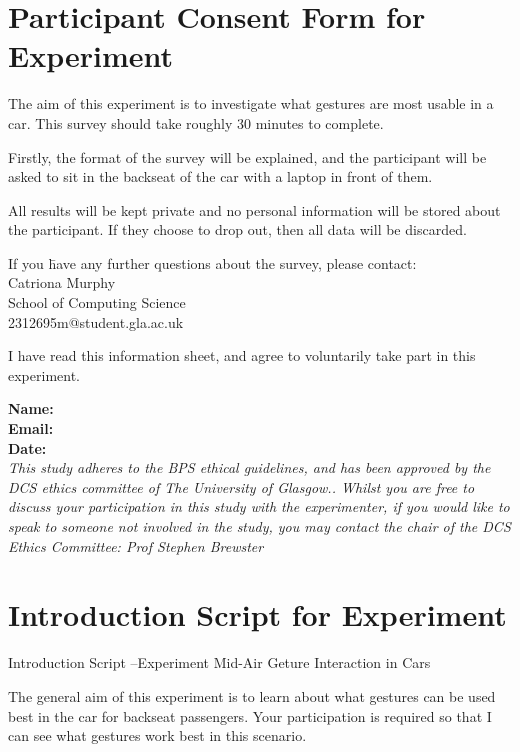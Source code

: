 \documentclass{l4proj}
\begin{document}
\begin{appendices}
\section{Participant Consent Form for Experiment}
\label{section:consentExp}
The aim of this experiment is to investigate what gestures are most usable in a car. This survey should take roughly 30 minutes to complete.

Firstly, the format of the survey will be explained, and the participant will be asked to sit in the backseat of the car with a laptop in front of them.

All results will be kept private and no personal information will be stored about the participant. If they choose to drop out, then all data will be discarded.

\begin{tabbing}
If you \=have any further questions about the survey, please contact:\\
\> Catriona Murphy\\

\>School of Computing Science\\

\>2312695m@student.gla.ac.uk\\

\end{tabbing}

I have read this information sheet, and agree to voluntarily take part in this experiment.

\textbf{Name:}\\
\textbf{Email:}\\
\textbf{Date:}\\


\emph{This study adheres to the BPS ethical guidelines, and has been approved by the DCS ethics committee of The University of Glasgow.. Whilst you are free to discuss your participation in this study with the experimenter, if you would like to speak to someone not involved in the study, you may contact the chair of the DCS Ethics Committee: Prof Stephen Brewster}

\section{Introduction Script for Experiment}
\label{section:introScriptExp}

Introduction Script –Experiment
Mid-Air Geture Interaction in Cars

The general aim of this experiment is to learn about what gestures can be used best in the car for backseat passengers. Your participation is required so that I can see what gestures work best in this scenario.


\end{appendices}
\end{document}
